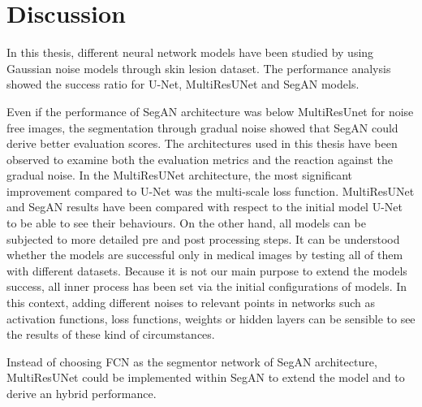 \chapter{Discussion}

    In this thesis, different neural network models have been studied by using Gaussian noise models through skin lesion dataset.
    The performance analysis showed the success ratio for U-Net, MultiResUNet and SegAN models.

    Even if the performance of SegAN architecture was below MultiResUnet for noise free images,
    the segmentation through gradual noise showed that SegAN could derive better evaluation scores.
    The architectures used in this thesis have been observed to examine both the evaluation metrics and the reaction against the gradual noise.
    In the MultiResUNet architecture, the most significant improvement compared to U-Net was the multi-scale loss function.
    MultiResUNet and SegAN results have been compared with respect to the initial model U-Net to be able to see their behaviours.
    On the other hand, all models can be subjected to more detailed pre and post processing steps.
    It can be understood whether the models are successful only in medical images by testing all of them with different datasets.
    Because it is not our main purpose to extend the models success, all inner process has been set via the initial configurations of models.
    In this context, adding different noises to relevant points in networks such as
    activation functions, loss functions, weights or hidden layers can be sensible to see the results of these kind of circumstances.

    Instead of choosing FCN as the segmentor network of SegAN architecture,
    MultiResUNet could be implemented within SegAN to extend the model and to derive an hybrid performance.